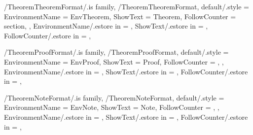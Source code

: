 
\pgfkeys
{
  /TheoremTheoremFormat/.is family, /TheoremTheoremFormat,
  default/.style =
  {
    EnvironmentName = {EnvTheorem},
    ShowText = {Theorem},
    FollowCounter = section,
  },
  EnvironmentName/.estore in = \GetTheoremTheoremFormatEnvironmentName,
  ShowText/.estore in = \GetTheoremTheoremFormatShowText,
  FollowCounter/.estore in = \GetTheoremTheoremFormatFollowCounter,
} %

\newcommand{\InsertTheorem}[2][\empty]
{%
  \InsertTheoremContent[#1]{\GetTheoremTheoremFormatEnvironmentName}{#2}%
} %

\newcommand{\InitTheoremTheoremFormat}
{%
  \ifthenelse{\equal{\GetTheoremTheoremFormatFollowCounter}{\empty}}
  {%
    \newtheorem{%
      \GetTheoremTheoremFormatEnvironmentName}{%
      \GetTheoremTheoremFormatShowText}%
  }%
  {%
    \newtheorem{%
      \GetTheoremTheoremFormatEnvironmentName}{%
      \GetTheoremTheoremFormatShowText}[%
      \GetTheoremTheoremFormatFollowCounter]%
  }%
} %


\pgfkeys
{
  /TheoremProofFormat/.is family, /TheoremProofFormat,
  default/.style =
  {
    EnvironmentName = {EnvProof},
    ShowText = {Proof},
    FollowCounter = \empty,
  },
  EnvironmentName/.estore in = \GetTheoremProofFormatEnvironmentName,
  ShowText/.estore in = \GetTheoremProofFormatShowText,
  FollowCounter/.estore in = \GetTheoremProofFormatFollowCounter,
} %

\newcommand{\InsertProof}[1]
{%
  \InsertTheoremContent[\empty]{%
    \GetTheoremProofFormatEnvironmentName}{#1}%
} %

\newcommand{\InitTheoremProofFormat}
{%
  \ifthenelse{\equal{\GetTheoremProofFormatFollowCounter}{\empty}}
  {%
    \newtheorem*{%
      \GetTheoremProofFormatEnvironmentName}{%
      \GetTheoremProofFormatShowText}
  }%
  {%
    \newtheorem{%
      \GetTheoremProofFormatEnvironmentName}{%
      \GetTheoremProofFormatShowText}[%
      \GetTheoremProofFormatFollowCounter]%
  }%
} %


\pgfkeys
{
  /TheoremNoteFormat/.is family, /TheoremNoteFormat,
  default/.style =
  {
    EnvironmentName = {EnvNote},
    ShowText = {Note},
    FollowCounter = \empty,
  },
  EnvironmentName/.estore in = \GetTheoremNoteFormatEnvironmentName,
  ShowText/.estore in = \GetTheoremNoteFormatShowText,
  FollowCounter/.estore in = \GetTheoremNoteFormatFollowCounter,
} %

